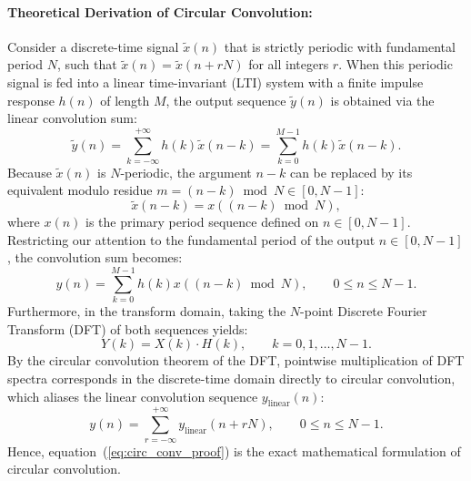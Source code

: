 \documentclass[12pt,a4paper]{article}
\begin{document}
\paragraph{Theoretical Derivation of Circular Convolution:}
Consider a discrete-time signal $\tilde{x}(n)$ that is strictly periodic with fundamental period $N$, such that $\tilde{x}(n) = \tilde{x}(n + rN)$ for all integers $r$. When this periodic signal is fed into a linear time-invariant (LTI) system with a finite impulse response $h(n)$ of length $M$, the output sequence $\tilde{y}(n)$ is obtained via the linear convolution sum:
\begin{equation*}
    \tilde{y}(n) = \sum_{k=-\infty}^{+\infty} h(k) \tilde{x}(n - k) = \sum_{k=0}^{M-1} h(k) \tilde{x}(n - k).
\end{equation*}
Because $\tilde{x}(n)$ is $N$-periodic, the argument $n - k$ can be replaced by its equivalent modulo residue $m = (n - k) \bmod N \in [0, N-1]$:
\begin{equation*}
    \tilde{x}(n - k) = x((n - k) \bmod N),
\end{equation*}
where $x(n)$ is the primary period sequence defined on $n \in [0, N-1]$. Restricting our attention to the fundamental period of the output $n \in [0, N-1]$, the convolution sum becomes:
\begin{equation}
    y(n) = \sum_{k=0}^{M-1} h(k) x((n - k) \bmod N), \qquad 0 \le n \le N-1.
    \label{eq:circ_conv_proof}
\end{equation}
Furthermore, in the transform domain, taking the $N$-point Discrete Fourier Transform (DFT) of both sequences yields:
\begin{equation*}
    Y(k) = X(k) \cdot H(k), \qquad k = 0, 1, \dots, N-1.
\end{equation*}
By the circular convolution theorem of the DFT, pointwise multiplication of DFT spectra corresponds in the discrete-time domain directly to circular convolution, which aliases the linear convolution sequence $y_{\text{linear}}(n)$:
\begin{equation}
    y(n) = \sum_{r=-\infty}^{+\infty} y_{\text{linear}}(n + rN), \qquad 0 \le n \le N-1.
    \label{eq:circ_aliasing}
\end{equation}
Hence, equation~(\ref{eq:circ_conv_proof}) is the exact mathematical formulation of circular convolution.
\end{document}
